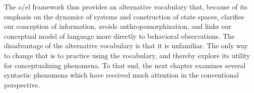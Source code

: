The o/el framework thus provides an alternative vocabulary that, because of its emphasis on the dynamics of systems and construction of state spaces, clarifies our conception of information, avoids anthropomorphization, and links our conceptual model of language more directly to behavioral observations. The disadvantage of the alternative vocabulary is that it is unfamiliar. The only way to change that is to practice using the vocabulary, and thereby explore its utility for conceptualizing phenomena. To that end, the next chapter examines several syntactic phenomena which have received much attention in the conventional perspective.  

